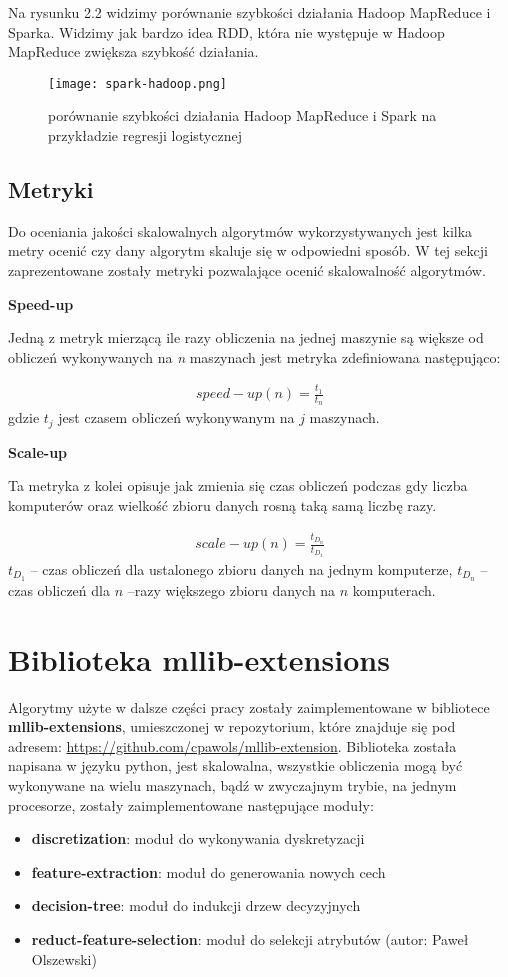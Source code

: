 \documentclass[magisterska]{pracamgr}
\theoremstyle{plain}
\theoremstyle{definition}
\theoremstyle{remark}
\begin{document}
Na rysunku 2.2 widzimy porównanie szybkości działania Hadoop MapReduce i Sparka. Widzimy jak bardzo idea RDD, która 
nie występuje w Hadoop MapReduce zwiększa szybkość działania.
\begin{figure}
 \caption{porównanie szybkości działania Hadoop MapReduce i Spark na przykładzie regresji logistycznej}
 \texttt{[image: spark-hadoop.png]}
\end{figure}

\section{Metryki}
Do oceniania jakości skalowalnych algorytmów wykorzystywanych jest kilka metry
 ocenić czy dany algorytm skaluje się w odpowiedni sposób. W tej sekcji zaprezentowane zostały
 metryki pozwalające ocenić skalowalność algorytmów.
 
\textbf{Speed-up}
 
Jedną z metryk mierzącą ile razy obliczenia na jednej maszynie są większe od
obliczeń wykonywanych na \emph{n} maszynach jest metryka zdefiniowana następująco:
 
\begin{align*}
 speed-up(n) = \frac{t_1}{t_n}
\end{align*}
gdzie $t_j$ jest czasem obliczeń wykonywanym na $j$ maszynach.
 
\textbf{Scale-up}
 
Ta metryka z kolei opisuje jak zmienia się czas obliczeń podczas gdy
liczba komputerów oraz wielkość zbioru danych rosną taką samą liczbę razy.
 
\begin{align*}
 scale-up(n) = \frac{t_{D_n}}{t_{D_1}}
\end{align*}
$t_{D_1}$ -- czas obliczeń dla ustalonego zbioru danych na jednym komputerze,
$t_{D_n}$ -- czas obliczeń dla $n$ --razy większego zbioru danych na $n$ komputerach.

\chapter{Biblioteka mllib-extensions}
Algorytmy użyte w dalsze części pracy zostały zaimplementowane w bibliotece \textbf{mllib-extensions},
umieszczonej w repozytorium, które znajduje się pod adresem: \url{https://github.com/cpawols/mllib-extension}.
Biblioteka została napisana w języku python,
jest skalowalna, wszystkie obliczenia mogą być wykonywane na wielu maszynach, bądź w zwyczajnym trybie, 
na jednym procesorze, zostały zaimplementowane następujące moduły:
  \begin{itemize}
   \item \textbf{discretization}: moduł do wykonywania dyskretyzacji
   \item \textbf{feature-extraction}: moduł do generowania nowych cech
   \item \textbf{decision-tree}: moduł do indukcji drzew decyzyjnych
   \item \textbf{reduct-feature-selection}: moduł do selekcji atrybutów (autor: Paweł Olszewski)
  \end{itemize}
\end{document}
